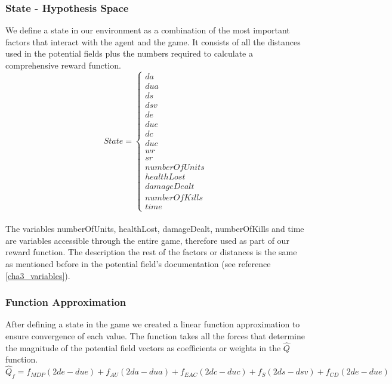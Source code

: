\subsubsection{State - Hypothesis Space}

We define a state in our environment as a combination of the most important factors that interact with the agent and the game. It consists of all the distances used in the potential fields plus the numbers required to calculate a comprehensive reward function. \\
\begin{displaymath}
                       State = \begin{cases}
                         da \\  dua \\  ds \\  dsv \\ de \\ due \\ dc \\ duc \\ wr \\ sr \\ numberOfUnits \\ healthLost \\ damageDealt \\ numberOfKills \\ time
                      \end{cases}
\end{displaymath}\\

The variables numberOfUnits, healthLost, damageDealt, numberOfKills and time are variables accessible through the entire game, therefore used as part of our reward function. The description the rest of the factors or distances is the same as mentioned before in the potential field's documentation  (see reference \ref{cha3_variables}).

\subsubsection{Function Approximation}

After defining a state in the game we created a linear function approximation to ensure convergence of each value. The function takes all the forces that determine the magnitude of the potential field vectors as coefficients or weights in the $\hat{Q}$ function. \\ 

\begin{equation}
\hat{Q}_f = f_{MDP} (2de - due) + f_{AU} (2da - dua) + f_{EAC} (2dc - duc) + f_{S}  (2ds - dsv) + f_{CD} (2de - due) 
\end{equation}
\label{rleq}

